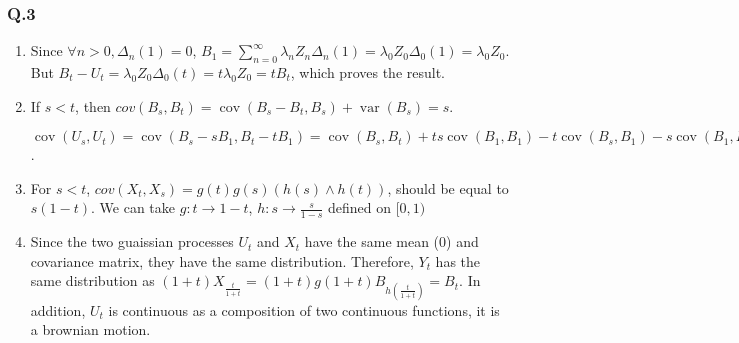 \documentclass[12pt]{article}
\newcommand{\Q}[1]{\subsubsection*{Q.#1}}
\DeclareMathOperator{\cov}{cov}
\DeclareMathOperator{\var}{var}
\begin{document}
\Q{3}
\begin{enumerate}[label=(\alph*)]
\item Since $\forall n > 0, \Delta_n(1) = 0$, $B_1 = \sum_{n=0}^{\infty} \lambda_n Z_n \Delta_n(1) = \lambda_0 Z_0 \Delta_0(1) = \lambda_0Z_0$.
  But $B_t - U_t = \lambda_0 Z_0 \Delta_0(t) = t\lambda_0 Z_0 = t B_t$, which proves the result.
\item
  If $s < t$, then $cov(B_s, B_t) = \cov(B_s - B_t, B_s) + \var(B_s) = s$.
  
  $\cov(U_s, U_t) = \cov(B_s - sB_1, B_t -tB_1) = \cov(B_s, B_t) + ts \cov(B_1, B_1) - t \cov(B_s, B_1) - s\cov(B_1, B_t) = s + ts - ts - ts = s - ts = s(1- t)$.

\item
  For $s < t$, $cov(X_t, X_s) = g(t)g(s) (h(s) \wedge h(t))$, should be equal to $s(1-t)$.
  We can take $g: t \rightarrow 1 - t$, $h: s \rightarrow \frac s{1 - s}$ defined on $[0, 1)$

\item
  Since the two guaissian processes $U_t$ and $X_t$ have the same mean (0) and covariance matrix, they have the same distribution. Therefore, $Y_t$ has the same distribution as $(1+t)X_{\frac{t}{1+t}} = (1+t)g(1+t)B_{h(\frac{t}{1+t})} = B_t$. In addition, $U_t$ is continuous as a composition of two continuous functions, it is a brownian motion.
  
\end{enumerate}
\end{document}
